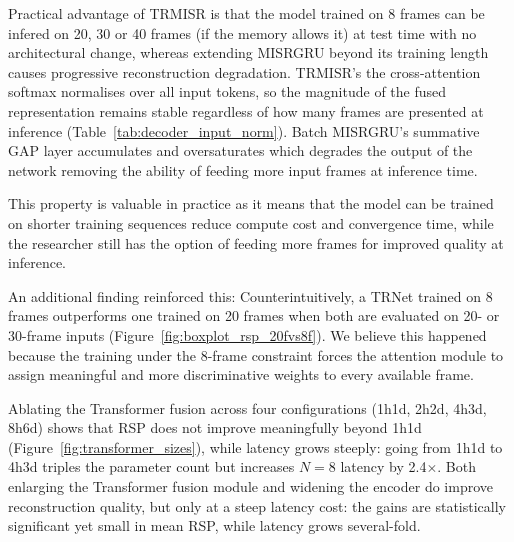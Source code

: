 Practical advantage of TRMISR is that the     
model trained on 8 frames can be infered on 20, 30 or 40 frames (if the memory allows it) 
at test time with no architectural change, whereas extending MISRGRU beyond its training length 
causes progressive reconstruction degradation. TRMISR's the cross-attention softmax normalises over all input tokens, so the magnitude of the
fused representation remains stable regardless of how many frames are presented at inference      
(Table~\ref{tab:decoder_input_norm}).
Batch MISRGRU's summative GAP layer accumulates and oversaturates which degrades the output of the network 
removing the ability of feeding more input frames at inference time.
                           
This property is valuable in practice as it means that the model can be trained on shorter training sequences 
reduce compute cost and convergence time, while the researcher still has the option of feeding more frames   
for improved quality at inference. 
                                                                                        
An additional finding reinforced this:                                         
Counterintuitively, a TRNet trained on 8 frames outperforms one trained on 20 frames
when both are evaluated on 20- or 30-frame inputs                                      
(Figure~\ref{fig:boxplot_rsp_20fvs8f}).
We believe this happened because the training under the   
8-frame constraint forces the attention module to assign meaningful and more discriminative    
weights to every available frame.                                                         
                                                                                        
Ablating the Transformer fusion across four configurations (1h1d, 2h2d, 4h3d, 8h6d)    
shows that RSP does not improve meaningfully beyond 1h1d (Figure~\ref{fig:transformer_sizes}), 
while latency grows steeply: going from 1h1d to 4h3d triples the parameter count 
but increases $N{=}8$ latency by 2.4$\times$. 
Both enlarging the Transformer fusion module and widening the encoder do improve
reconstruction quality, but only at a steep latency cost: the gains are statistically
significant yet small in mean RSP, while latency grows several-fold.                          

